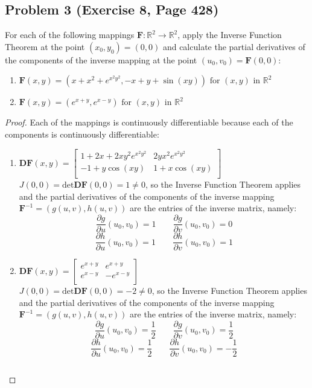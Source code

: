 \documentclass{article}
\begin{document}
\subsection*{Problem 3 (Exercise 8, Page 428)}
For each of the following mappings $\textbf{F} \colon \mathbb{R}^2 \to \mathbb{R}^2$, apply the Inverse Function Theorem at the point $(x_0, y_0) = (0, 0)$ and calculate the partial derivatives of the components of the inverse mapping at the point $(u_0, v_0) = \textbf{F}(0, 0)$:
\begin{enumerate}[label = \alph*.]
    \item $\textbf{F}(x, y) = (x+x^2+e^{x^2y^2}, -x+y+\sin(xy)) \text{ for $(x, y)$ in $\mathbb{R}^2$}$
    \item $\textbf{F}(x, y) = (e^{x+y}, e^{x-y}) \text{ for $(x, y)$ in $\mathbb{R}^2$}$
\end{enumerate}
\begin{proof}
Each of the mappings is continuously differentiable because each of the components is continuously differentiable:
\begin{enumerate}[label = \alph*.]
    \item $\textbf{DF}(x, y) = \begin{bmatrix}
1 + 2x + 2xy^2e^{x^2y^2} & 2yx^2e^{x^2y^2} \\
-1 + y\cos(xy) & 1 + x\cos(xy) \\
\end{bmatrix}$ \\
$J(0, 0) = \text{det}\textbf{DF}(0, 0) = 1 \neq 0$, so the Inverse Function Theorem applies and the partial derivatives of the components of the inverse mapping $\textbf{F}^{-1} = (g(u, v), h(u, v))$ are the entries of the inverse matrix, namely:
\[ \frac{\partial g}{\partial u}(u_0, v_0) = 1 \qquad \frac{\partial g}{\partial v}(u_0, v_0) = 0\]
\[ \frac{\partial h}{\partial u}(u_0, v_0) = 1 \qquad \frac{\partial h}{\partial v}(u_0, v_0) = 1\]

    \item $\textbf{DF}(x, y) = \begin{bmatrix}
e^{x+y} & e^{x+y} \\
e^{x-y} & -e^{x-y} \\
\end{bmatrix}$ \\
$J(0, 0) = \text{det}\textbf{DF}(0, 0) = -2 \neq 0$, so the Inverse Function Theorem applies and the partial derivatives of the components of the inverse mapping $\textbf{F}^{-1} = (g(u, v), h(u, v))$ are the entries of the inverse matrix, namely:
\[ \frac{\partial g}{\partial u}(u_0, v_0) = \frac{1}{2} \qquad \frac{\partial g}{\partial v}(u_0, v_0) = \frac{1}{2}\]
\[ \frac{\partial h}{\partial u}(u_0, v_0) = \frac{1}{2} \qquad \frac{\partial h}{\partial v}(u_0, v_0) = -\frac{1}{2}\]

\[ \]
\end{enumerate}
\end{proof}
\end{document}
